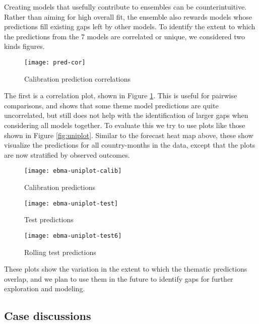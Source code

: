 \documentclass[pdftex,11pt]{article}
\begin{document}
Creating models that usefully contribute to ensembles can be counterintuitive. Rather than aiming for high overall fit, the ensemble also rewards models whose predictions fill existing gaps left by other models. To identify the extent to which the predictions from the 7 models are correlated or unique, we considered two kinds figures. 

\begin{figure}
  \centering
  \caption{Calibration prediction correlations}
  \label{fig:predcor}
  \texttt{[image: pred-cor]}
\end{figure}

The first is a correlation plot, shown in Figure \ref{fig:predcor}. This is useful for pairwise comparisons, and shows that some theme model predictions are quite uncorrelated, but still does not help with the identification of larger gaps when considering all models together. To evaluate this we try to use plots like those shown in Figure \ref{fig:uniplot}. Similar to the forecast heat map above, these show visualize the predictions for all country-months in the data, except that the plots are now stratified by observed outcomes.

\begin{figure*}
\begin{subfigure}{.8\textwidth}
  \centering
  \caption{Calibration predictions}
  \texttt{[image: ebma-uniplot-calib]}
\end{subfigure}
\begin{subfigure}{.8\textwidth}
  \centering
  \caption{Test predictions}
  \texttt{[image: ebma-uniplot-test]}
\end{subfigure}
\begin{subfigure}{.8\textwidth}
  \centering
  \caption{Rolling test predictions}
  \texttt{[image: ebma-uniplot-test6]}
\end{subfigure}
\caption{Comparison of model predictions for negative and positive outcomes.}
\label{fig:uniplot}
\end{figure*}

These plots show the variation in the extent to which the thematic predictions overlap, and we plan to use them in the future to identify gaps for further exploration and modeling. 

\subsection{Case discussions}
\end{document}
